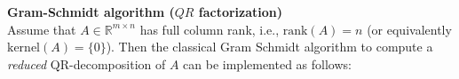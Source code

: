 \textbf{Gram-Schmidt algorithm ($QR$ factorization)}\\

%				
Assume that $A \in \mathbb{R}^{m \times n}$ has full column rank, i.e., $\text{rank}(A) = n$ (or equivalently $\text{kernel}(A)=\{0\}$). Then the classical Gram Schmidt algorithm to compute a \textit{reduced} QR-decomposition of $A$ can be implemented as follows:\\
